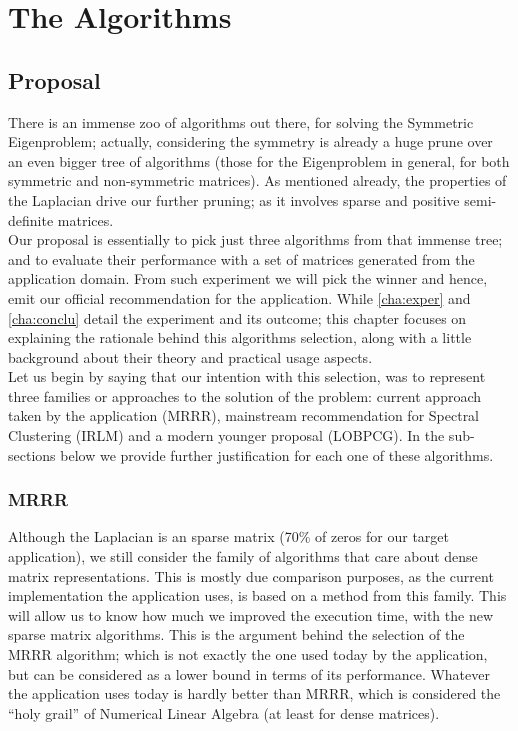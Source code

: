 \chapter{The Algorithms}
\label{cha:algs}

\section{Proposal}
\label{sec:propo}
There is an immense zoo of algorithms out there, for solving the
Symmetric Eigenproblem; actually, considering the symmetry is already
a huge prune over an even bigger tree of algorithms (those for the
Eigenproblem in general, for both symmetric and non-symmetric
matrices). As mentioned already, the properties of the Laplacian drive
our further pruning; as it involves sparse and positive semi-definite 
matrices. \\

Our proposal is essentially to pick just three algorithms from that
immense tree; and to evaluate their performance with a set of matrices
generated from the application domain. From such experiment we will
pick the winner and hence, emit our official recommendation for the
application. While \cref{cha:exper} and \cref{cha:conclu} detail the
experiment and its outcome; this chapter focuses on explaining the
rationale behind this algorithms selection, along with a little
background about their theory and practical usage aspects. \\

Let us begin by saying that our intention with this selection, was to
represent three families or approaches to the solution of the problem:
current approach taken by the application (\gls{MRRR}), mainstream
recommendation for Spectral Clustering (\gls{IRLM}) and a modern
younger proposal (\gls{LOBPCG}). In the sub-sections below we provide
further justification for each one of these algorithms.

\subsection{\gls{MRRR}}
Although the \gls{Laplacian} is an sparse matrix (70\% of zeros for our
target application), we still consider the family of algorithms that
care about dense matrix representations. This is mostly due comparison
purposes, as the current implementation the application uses, is
based on a method from this family. This will allow us to know how
much we improved the execution time, with the new sparse matrix
algorithms. This is the argument behind the selection of the
\gls{MRRR} algorithm; which is not exactly the one used today by the
application, but can be considered as a lower bound in terms of its
performance. Whatever the application uses today is hardly better than
\gls{MRRR}, which is considered the ``holy grail'' of Numerical Linear
Algebra \cite{hogben06} (at least for dense matrices).\\ 


